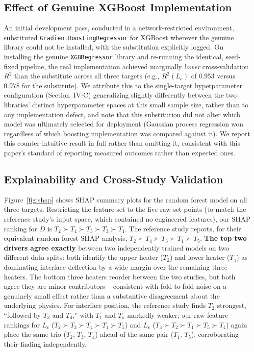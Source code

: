 \documentclass[conference]{IEEEtran}
\begin{document}
\subsection{Effect of Genuine XGBoost Implementation}
An initial development pass, conducted in a network-restricted environment, substituted \texttt{GradientBoostingRegressor} for XGBoost wherever the genuine library could not be installed, with the substitution explicitly logged. On installing the genuine \texttt{XGBRegressor} library and re-running the identical, seed-fixed pipeline, the real implementation achieved marginally \emph{lower} cross-validation $R^2$ than the substitute across all three targets (e.g., $R^2(L_c)$ of 0.953 versus 0.978 for the substitute). We attribute this to the single-target hyperparameter configuration (Section~IV-C) generalizing slightly differently between the two libraries' distinct hyperparameter spaces at this small sample size, rather than to any implementation defect, and note that this substitution did not alter which model was ultimately selected for deployment (Gaussian process regression won regardless of which boosting implementation was compared against it). We report this counter-intuitive result in full rather than omitting it, consistent with this paper's standard of reporting measured outcomes rather than expected ones.

\subsection{Explainability and Cross-Study Validation}
Figure~\ref{fig:shap} shows SHAP summary plots for the random forest model on all three targets. Restricting the feature set to the five raw set-points (to match the reference study's input space, which contained no engineered features), our SHAP ranking for $D$ is $T_2 \succ T_4 \succ T_5 \succ T_3 \succ T_1$. The reference study reports, for their equivalent random forest SHAP analysis, $T_2\succ T_4\succ T_3\succ T_1\succ T_5$. \textbf{The top two drivers agree exactly} between two independently trained models on two different data splits: both identify the upper heater ($T_2$) and lower heater ($T_4$) as dominating interface deflection by a wide margin over the remaining three heaters. The bottom three heaters reorder between the two studies, but both agree they are minor contributors -- consistent with fold-to-fold noise on a genuinely small effect rather than a substantive disagreement about the underlying physics. For interface position, the reference study finds $T_2$ strongest, ``followed by $T_3$ and $T_4$,'' with $T_1$ and $T_5$ markedly weaker; our raw-feature rankings for $L_c$ ($T_2\succ T_3\succ T_4\succ T_1\succ T_5$) and $L_e$ ($T_3\succ T_2\succ T_1\succ T_5\succ T_4$) again place the same trio ($T_2$, $T_3$, $T_4$) ahead of the same pair ($T_1$, $T_5$), corroborating their finding independently.
\end{document}
